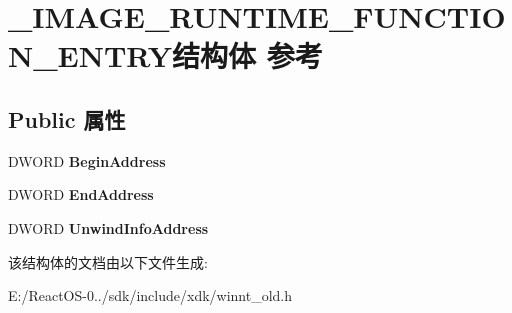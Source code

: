 \hypertarget{struct___i_m_a_g_e___r_u_n_t_i_m_e___f_u_n_c_t_i_o_n___e_n_t_r_y}{}\section{\+\_\+\+I\+M\+A\+G\+E\+\_\+\+R\+U\+N\+T\+I\+M\+E\+\_\+\+F\+U\+N\+C\+T\+I\+O\+N\+\_\+\+E\+N\+T\+R\+Y结构体 参考}
\label{struct___i_m_a_g_e___r_u_n_t_i_m_e___f_u_n_c_t_i_o_n___e_n_t_r_y}
\subsection*{Public 属性}
\begin{DoxyCompactItemize}
\item 
\mbox{\label{struct___i_m_a_g_e___r_u_n_t_i_m_e___f_u_n_c_t_i_o_n___e_n_t_r_y_ac31f2411ab2c08199982992d2b1224de}} 
D\+W\+O\+RD {\bfseries Begin\+Address}
\item 
\mbox{\label{struct___i_m_a_g_e___r_u_n_t_i_m_e___f_u_n_c_t_i_o_n___e_n_t_r_y_acad40eb250327f794de8f1b60b17d05e}} 
D\+W\+O\+RD {\bfseries End\+Address}
\item 
\mbox{\label{struct___i_m_a_g_e___r_u_n_t_i_m_e___f_u_n_c_t_i_o_n___e_n_t_r_y_a9793b170e687665dd809699738c91ef6}} 
D\+W\+O\+RD {\bfseries Unwind\+Info\+Address}
\end{DoxyCompactItemize}


该结构体的文档由以下文件生成\+:\begin{DoxyCompactItemize}
\item 
E\+:/\+React\+O\+S-\/0../sdk/include/xdk/winnt\+\_\+old.\+h\end{DoxyCompactItemize}
